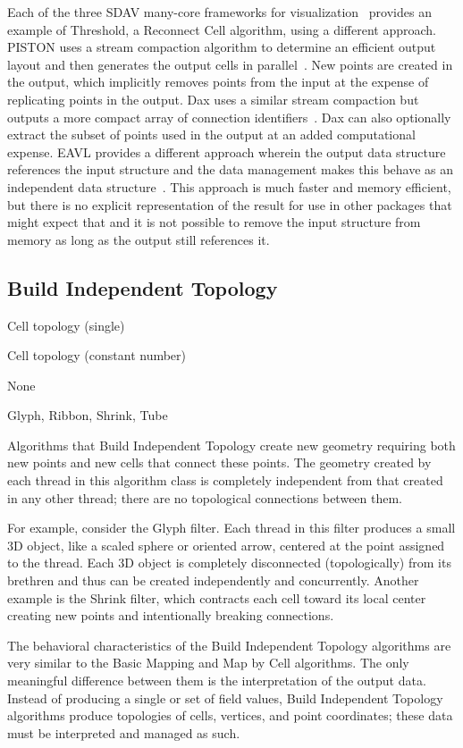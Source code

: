 \documentclass{sig-alternate}
\newcommand*{\lcite}[1]{~\cite{#1}}
\newcommand{\algclass}[1]{\textsf{#1}}
\newcommand{\alg}[1]{#1}
\newcommand{\algorithmclasssection}[1]{\subsection*{#1}}
\newcommand{\algorithmclass}[5]{
  \algorithmclasssection{#1} %
  \begin{description}[leftmargin=9em,style=nextline,noitemsep]
    \raggedright
  \item[Input] #2
  \item[Output] #3
  \item[Interdependence] #4
  \item[Algorithms] #5
  \end{description}
}
\begin{document}
Each of the three SDAV many-core frameworks for
visualization\lcite{Sewell2012} provides an example of \alg{Threshold}, a
\algclass{Reconnect Cell} algorithm, using a different approach. PISTON
uses a stream compaction algorithm to determine an efficient output layout
and then generates the output cells in parallel\lcite{PISTON}. New points
are created in the output, which implicitly removes points from the input
at the expense of replicating points in the output. Dax uses a similar
stream compaction but outputs a more compact array of connection
identifiers\lcite{Maynard2013}. Dax can also optionally extract the subset
of points used in the output at an added computational expense. EAVL
provides a different approach wherein the output data structure references
the input structure and the data management makes this behave as an
independent data structure\lcite{Meredith2012}. This approach is much
faster and memory efficient, but there is no explicit representation of the
result for use in other packages that might expect that and it is not
possible to remove the input structure from memory as long as the output
still references it.


\algorithmclass{Build Independent Topology}
               {Cell topology (single)} %
               {Cell topology (constant number)} %
               {None} %
               {
                 Glyph,
                 Ribbon,
                 Shrink,
                 Tube
               }

\noindent
Algorithms that \algclass{Build Independent Topology} create new geometry
requiring both new points and new cells that connect these points. The
geometry created by each thread in this algorithm class is completely
independent from that created in any other thread; there are no topological
connections between them.

For example, consider the \alg{Glyph} filter. Each thread in this filter
produces a small 3D object, like a scaled sphere or oriented arrow,
centered at the point assigned to the thread. Each 3D object is completely
disconnected (topologically) from its brethren and thus can be created
independently and concurrently. Another example is the \alg{Shrink} filter,
which contracts each cell toward its local center creating new points and
intentionally breaking connections.

The behavioral characteristics of the \algclass{Build Independent Topology}
algorithms are very similar to the \algclass{Basic Mapping} and
\algclass{Map by Cell} algorithms. The only meaningful difference between
them is the interpretation of the output data. Instead of producing a
single or set of field values, \algclass{Build Independent Topology}
algorithms produce topologies of cells, vertices, and point coordinates;
these data must be interpreted and managed as such.
\end{document}

